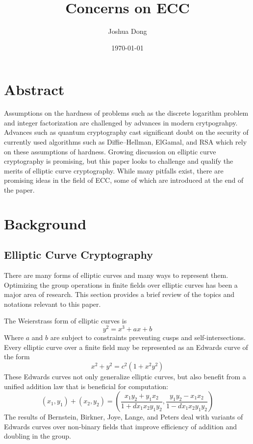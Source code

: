 \documentclass{article}
\begin{document}
\title{Concerns on ECC}
\author{Joshua Dong}
\date{\today}
\maketitle

\section{Abstract}
Assumptions on the hardness of problems such as the discrete logarithm problem
and integer factorization are challenged by advances in modern crytpograhpy.
Advances such as quantum cryptography cast significant doubt on the security of
currently used algorithms such as Diffie–Hellman, ElGamal, and RSA which rely
on these assumptions of hardness. Growing discussion on elliptic curve
cryptography is promising, but this paper looks to challenge and qualify the
merits of elliptic curve cryptography. While many pitfalls exist, there are
promising ideas in the field of ECC, some of which are introduced at the end of
the paper.
 

\section{Background}
\subsection{Elliptic Curve Cryptography}
There are many forms of elliptic curves and many ways to represent them.
Optimizing the group operations in finite fields over elliptic curves has been
a major area of research. This section provides a brief review of the topics
and notations relevant to this paper.

The Weierstrass form of elliptic curves is
\begin{equation}
    y^2 = x^3 + ax + b
\end{equation}
Where $a$ and $b$ are subject to constraints preventing cusps and
self-intersections. Every elliptic curve over a finite field may be represented
as an Edwards curve \cite{tec} of the form 
\begin{equation}
    x^2 + y^2 = c^2(1 + x^2y^2)
\end{equation}
These Edwards curves not only generalize elliptic curves, but also benefit from
a unified addition law that is beneficial for computation:
\begin{equation}
    (x_1, y_1) + (x_2, y_2) =
    (\frac{x_1y_2 + y_1x_2}{1 + dx_1x_2y_1y_2}, \frac{y_1y_2 - x_1x_2}{1 - dx_1x_2y_1y_2})
\end{equation}
The results of Bernstein, Birkner, Joye, Lange, and Peters deal with variants
of Edwards curves over non-binary fields that improve efficiency of addition
and doubling in the group.
\end{document}

